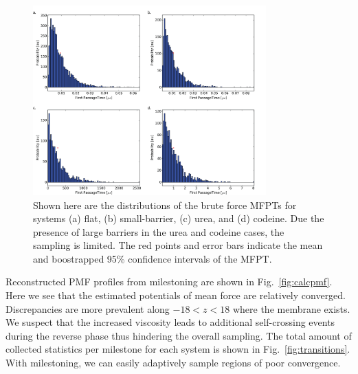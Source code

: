     \begin{figure}[!htbp]
    \begin{center}
        \includegraphics[width=0.8\textwidth]{Figures/mfptdist}
        \caption[Distributions of brute force MFPTS for systems (a) flat, (b) small-barrier, (c) urea, and (d) codeine]{Shown here are the distributions of the brute force MFPTs for systems (a) flat, (b) small-barrier, (c) urea, and (d) codeine. Due the presence of large barriers in the urea and codeine cases, the sampling is limited. The red points and error bars indicate the mean and boostrapped 95\% confidence intervals of the MFPT.}
        \label{fig:mfpts}
    \end{center}
    \end{figure}

    \par Reconstructed PMF profiles from milestoning are shown in Fig.~\ref{fig:calcpmf}. Here we see that the estimated potentials of mean force are relatively converged. Discrepancies are more prevalent along $-18<z<18$ where the membrane exists. We suspect that the increased viscosity leads to additional self-crossing events during the reverse phase thus hindering the overall sampling. The total amount of collected statistics per milestone for each system is shown in Fig.~\ref{fig:transitions}. With milestoning, we can easily adaptively sample regions of poor convergence.

